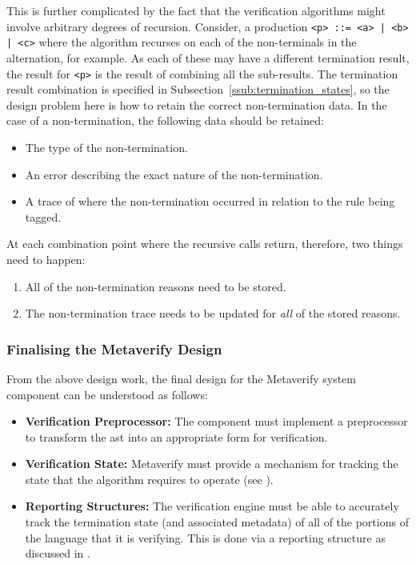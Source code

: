 This is further complicated by the fact that the verification algorithms might involve arbitrary degrees of recursion. 
Consider, a production \texttt{<p> ::= <a> | <b> | <c>} where the algorithm recurses on each of the non-terminals in the alternation, for example. 
As each of these may have a different termination result, the result for \texttt{<p>} is the result of combining all the sub-results. 
The termination result combination is specified in Subsection~\ref{ssub:termination_states}, so the design problem here is how to retain the correct non-termination data. 
In the case of a non-termination, the following data should be retained:
\begin{itemize}
    \item The type of the non-termination.
    \item An error describing the exact nature of the non-termination.
    \item A trace of where the non-termination occurred in relation to the rule being tagged. 
\end{itemize}

At each combination point where the recursive calls return, therefore, two things need to happen:
\begin{enumerate}
    \item All of the non-termination reasons need to be stored.
    \item The non-termination trace needs to be updated for \textit{all} of the stored reasons. 
\end{enumerate}


\subsubsection{Finalising the Metaverify Design} %
\label{ssub:finalising_the_metaverify_design}
From the above design work, the final design for the Metaverify system component can be understood as follows:
\begin{itemize}
    \item \textbf{Verification Preprocessor:} The component must implement a preprocessor to transform the \gls{ast} into an appropriate form for verification.
    \item \textbf{Verification State:} Metaverify must provide a mechanism for tracking the state that the algorithm requires to operate (see ).
    \item \textbf{Reporting Structures:} The verification engine must be able to accurately track the termination state (and associated metadata) of all of the portions of the language that it is verifying. 
    This is done via a reporting structure as discussed in .
\end{itemize}

